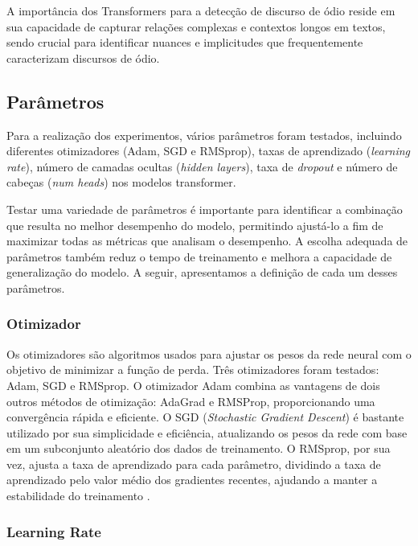 \documentclass[conference]{IEEEtran}
\begin{document}
A importância dos Transformers para a detecção de discurso de ódio reside em sua capacidade de capturar relações complexas e contextos longos em textos, sendo crucial para identificar nuances e implicitudes que frequentemente caracterizam discursos de ódio.

\subsection{Parâmetros}

Para a realização dos experimentos, vários parâmetros foram testados, incluindo diferentes otimizadores (Adam, SGD e RMSprop), taxas de aprendizado (\textit{learning rate}), número de camadas ocultas (\textit{hidden layers}), taxa de \textit{dropout} e número de cabeças (\textit{num heads}) nos modelos transformer. 

Testar uma variedade de parâmetros é importante para identificar a combinação que resulta no melhor desempenho do modelo, permitindo ajustá-lo a fim de maximizar todas as métricas que analisam o desempenho. A escolha adequada de parâmetros também reduz o tempo de treinamento e melhora a capacidade de generalização do modelo. A seguir, apresentamos a definição de cada um desses parâmetros. \\

\subsubsection{Otimizador}

Os otimizadores são algoritmos usados para ajustar os pesos da rede neural com o objetivo de minimizar a função de perda. Três otimizadores foram testados: Adam, SGD e RMSprop. O otimizador Adam combina as vantagens de dois outros métodos de otimização: AdaGrad e RMSProp, proporcionando uma convergência rápida e eficiente. O SGD (\textit{Stochastic Gradient Descent}) é bastante utilizado por sua simplicidade e eficiência, atualizando os pesos da rede com base em um subconjunto aleatório dos dados de treinamento. O RMSprop, por sua vez, ajusta a taxa de aprendizado para cada parâmetro, dividindo a taxa de aprendizado pelo valor médio dos gradientes recentes, ajudando a manter a estabilidade do treinamento \cite{otm}. \\

\subsubsection{Learning Rate}
\end{document}

